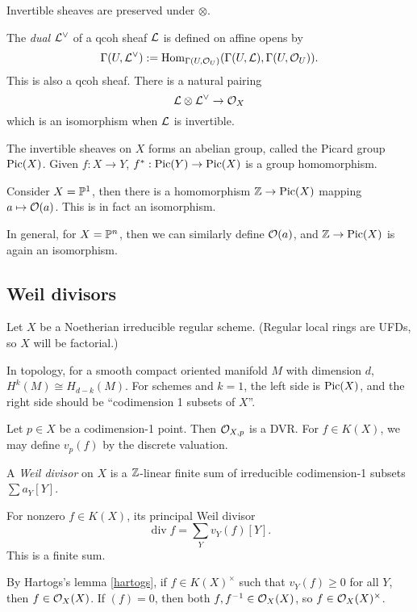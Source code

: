 \documentclass[11pt]{amsart}
\begin{document}
Invertible sheaves are preserved under $\otimes$.

\begin{defn}
    The \emph{dual} $\mathcal{L}^\vee$ of a qcoh sheaf $\mathcal{L}$ is defined on affine opens by
    \[\Gamma(U, \mathcal{L}^\vee) := \operatorname{Hom}_{\Gamma(U, \mathcal{O}_U)}(\Gamma(U, \mathcal{L}), \Gamma(U, \mathcal{O}_U)).\]
    This is also a qcoh sheaf. There is a natural pairing
    \[\mathcal{L}\otimes \mathcal{L}^\vee \to \mathcal{O}_X\]
    which is an isomorphism when $\mathcal{L}$ is invertible.
\end{defn}

\begin{defn}
    The invertible sheaves on $X$ forms an abelian group, called the Picard group $\operatorname{Pic}(X)$. Given $f:X\to Y$, $f^\ast:\operatorname{Pic}(Y)\to \operatorname{Pic}(X)$ is a group homomorphism.
\end{defn}

\begin{exm}
    Consider $X = \mathbb{P}^1$, then there is a homomorphism $\mathbb{Z}\to \operatorname{Pic}(X)$ mapping $a\mapsto \mathcal{O}(a)$. This is in fact an isomorphism.

    In general, for $X = \mathbb{P}^n$, then we can similarly define $\mathcal{O}(a)$, and $\mathbb{Z}\to \operatorname{Pic}(X)$ is again an isomorphism.
\end{exm}


\subsection{Weil divisors}

Let $X$ be a Noetherian irreducible regular scheme. (Regular local rings are UFDs, so $X$ will be factorial.)

In topology, for a smooth compact oriented manifold $M$ with dimension $d$, $H^k(M)\cong H_{d-k}(M)$. For schemes and $k=1$, the left side is $\operatorname{Pic}(X)$, and the right side should be ``codimension 1 subsets of $X$''.

Let $p\in X$ be a codimension-1 point. Then $\mathcal{O}_{X,p}$ is a DVR. For $f\in K(X)$, we may define $v_p(f)$ by the discrete valuation. 

\begin{defn}
    A \emph{Weil divisor} on $X$ is a $\mathbb{Z}$-linear finite sum of irreducible codimension-1 subsets $\sum a_Y [Y]$. 

    For nonzero $f\in K(X)$, its principal Weil divisor
    \[\operatorname{div} f = \sum_Y v_Y(f) [Y].\]
    This is a finite sum.
\end{defn}

By Hartogs's lemma \ref{hartogs}, if $f\in K(X)^\times$ such that $v_Y(f)\ge 0$ for all $Y$, then $f\in \mathcal{O}_X(X)$. If $(f) = 0$, then both $f,f^{-1}\in \mathcal{O}_X(X)$, so $f\in \mathcal{O}_X(X)^\times$.
\end{document}
